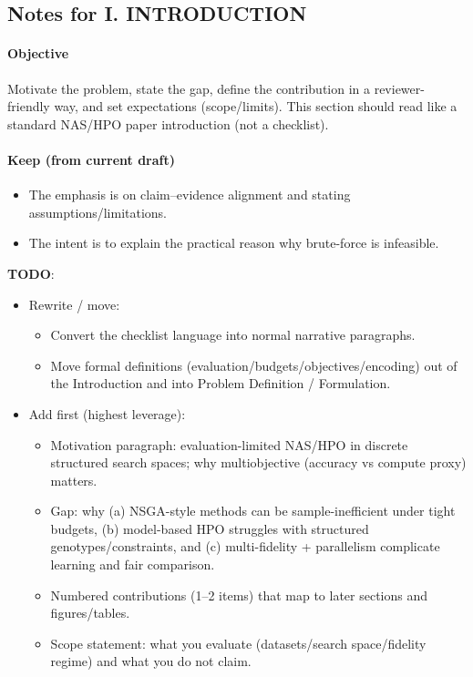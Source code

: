 \subsection*{Notes for I. INTRODUCTION}
\paragraph{Objective}
Motivate the problem, state the gap, define the contribution in a reviewer-friendly way, and set expectations (scope/limits). This section should read like a standard NAS/HPO paper introduction (not a checklist).

\paragraph{Keep (from current draft)}
\begin{itemize}
  \item The emphasis is on claim–evidence alignment and stating assumptions/limitations.
  \item The intent is to explain the practical reason why brute-force is infeasible.
\end{itemize}

\textbf{TODO}:
\begin{itemize}
    \item Rewrite / move:
    \begin{itemize}
    \item Convert the checklist language into normal narrative paragraphs.
    \item Move formal definitions (evaluation/budgets/objectives/encoding) out of the Introduction and into Problem Definition / Formulation.
    \end{itemize}
\end{itemize}

\begin{itemize}
    \item Add first (highest leverage):
    \begin{itemize}
    \item Motivation paragraph: evaluation-limited NAS/HPO in discrete structured search spaces; why multiobjective (accuracy vs compute proxy) matters.
    \item Gap: why (a) NSGA-style methods can be sample-inefficient under tight budgets, (b) model-based HPO struggles with structured genotypes/constraints, and (c) multi-fidelity + parallelism complicate learning and fair comparison.
    \item Numbered contributions (1–2 items) that map to later sections and figures/tables.
    \item Scope statement: what you evaluate (datasets/search space/fidelity regime) and what you do not claim.
    \end{itemize}
\end{itemize}


